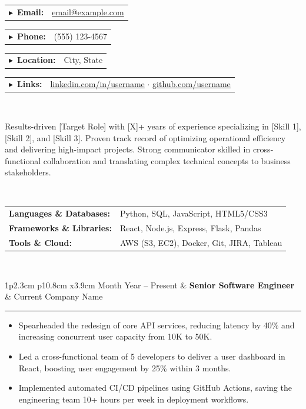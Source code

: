 \documentclass[10pt,a4paper]{article}
\newcommand{\mystrut}{\rule[-.3\baselineskip]{0pt}{\baselineskip}}
\newcommand{\larrow}{$\blacktriangleright$\ }
\newcommand{\cvsection}[1]{
    \vspace{8pt}
    \colorbox{sectcol}{\mystrut \makebox[1\linewidth][l]{
        \textcolor{white}{\ \larrow \textbf{#1}}
    }}\\
    \vspace{-4pt}
}
\newcommand{\metasection}[2]{
    \begin{tabular*}{1\textwidth}{p{2.4cm} p{11.6cm}}
        \textcolor{sectcol}{\larrow \textbf{#1}} & #2 \\[8pt]
    \end{tabular*}
}
\newcommand{\cvevent}[3]{
    \vspace{6pt}
    \begin{tabular*}{1\textwidth}{p{2.3cm} p{10.8cm} x{3.9cm}}
        \textcolor{bgcol}{#1} & \textbf{#2} & \vspace{2.5pt}\textcolor{sectcol}{#3}
    \end{tabular*}
    \vspace{-12pt}
    \textcolor{softcol}{\hrule}
    \vspace{4pt}
}
\begin{document}
\color{textColor}

\vspace{-20.55pt}
\hspace{-0.25\linewidth}\colorbox{bgcol}{}
\vspace{12pt}

\metasection{Email:}{\href{mailto:email@example.com}{email@example.com}}
\metasection{Phone:}{(555) 123-4567}
\metasection{Location:}{City, State}
\metasection{Links:}{\href{https://linkedin.com/in/username}{linkedin.com/in/username} $\cdot$ \href{https://github.com/username}{github.com/username}}

\vspace{4pt}

\cvsection{Summary}
Results-driven [Target Role] with [X]+ years of experience specializing in [Skill 1], [Skill 2], and [Skill 3]. Proven track record of optimizing operational efficiency and delivering high-impact projects. Strong communicator skilled in cross-functional collaboration and translating complex technical concepts to business stakeholders.
\vspace{4pt}

\cvsection{Skills}
\begin{tabular}{ @{} p{1.8in} @{} p{5.2in} }
    \textbf{Languages \& Databases:} & Python, SQL, JavaScript, HTML5/CSS3 \\
    \textbf{Frameworks \& Libraries:} & React, Node.js, Express, Flask, Pandas \\
    \textbf{Tools \& Cloud:} & AWS (S3, EC2), Docker, Git, JIRA, Tableau \\
\end{tabular}
\vspace{4pt}

\cvsection{Experience}

\cvevent{Month Year -- Present}{Senior Software Engineer}{Current Company Name}
\begin{itemize}
    \item Spearheaded the redesign of core API services, reducing latency by 40\% and increasing concurrent user capacity from 10K to 50K.
    \item Led a cross-functional team of 5 developers to deliver a user dashboard in React, boosting user engagement by 25\% within 3 months.
    \item Implemented automated CI/CD pipelines using GitHub Actions, saving the engineering team 10+ hours per week in deployment workflows.
\end{itemize}
\vspace{6pt}
\end{document}
